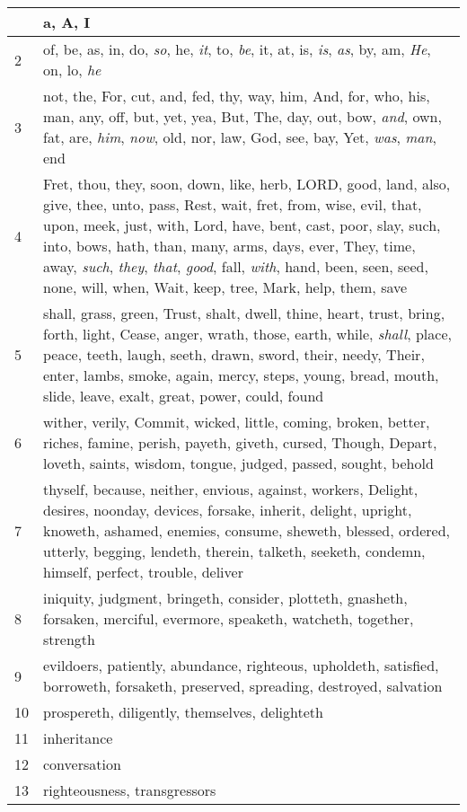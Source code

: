 \begin{longtable}{l|p{3.75in}}
\hline \hline
\endlastfoot
1 & a, A, I \\ \hline
2 & of, be, as, in, do, \emph{so}, he, \emph{it}, to, \emph{be}, it, at, is, \emph{is}, \emph{as}, by, am, \emph{He}, on, lo, \emph{he} \\ \hline
3 & not, the, For, cut, and, fed, thy, way, him, And, for, who, his, man, any, off, but, yet, yea, But, The, day, out, bow, \emph{and}, own, fat, are, \emph{him}, \emph{now}, old, nor, law, God, see, bay, Yet, \emph{was}, \emph{man}, end \\ \hline
4 & Fret, thou, they, soon, down, like, herb, LORD, good, land, also, give, thee, unto, pass, Rest, wait, fret, from, wise, evil, that, upon, meek, just, with, Lord, have, bent, cast, poor, slay, such, into, bows, hath, than, many, arms, days, ever, They, time, away, \emph{such}, \emph{they}, \emph{that}, \emph{good}, fall, \emph{with}, hand, been, seen, seed, none, will, when, Wait, keep, tree, Mark, help, them, save \\ \hline
5 & shall, grass, green, Trust, shalt, dwell, thine, heart, trust, bring, forth, light, Cease, anger, wrath, those, earth, while, \emph{shall}, place, peace, teeth, laugh, seeth, drawn, sword, their, needy, Their, enter, lambs, smoke, again, mercy, steps, young, bread, mouth, slide, leave, exalt, great, power, could, found \\ \hline
6 & wither, verily, Commit, wicked, little, coming, broken, better, riches, famine, perish, payeth, giveth, cursed, Though, Depart, loveth, saints, wisdom, tongue, judged, passed, sought, behold \\ \hline
7 & thyself, because, neither, envious, against, workers, Delight, desires, noonday, devices, forsake, inherit, delight, upright, knoweth, ashamed, enemies, consume, sheweth, blessed, ordered, utterly, begging, lendeth, therein, talketh, seeketh, condemn, himself, perfect, trouble, deliver \\ \hline
8 & iniquity, judgment, bringeth, consider, plotteth, gnasheth, forsaken, merciful, evermore, speaketh, watcheth, together, strength \\ \hline
9 & evildoers, patiently, abundance, righteous, upholdeth, satisfied, borroweth, forsaketh, preserved, spreading, destroyed, salvation \\ \hline
10 & prospereth, diligently, themselves, delighteth \\ \hline
11 & inheritance \\ \hline
12 & conversation \\ \hline
13 & righteousness, transgressors \\ \hline
\end{longtable}






